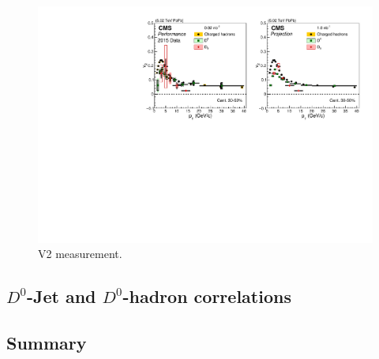 \begin{figure}[!ht]
\begin{center}
\includegraphics[width=.90\textwidth]{figures/cV2_lumiMB_1.pdf}
\caption{V2 measurement.}
\label{fig:v2_projection}
\end{center}
\end{figure}



\subsection{$D^0$-Jet and $D^0$-hadron correlations}


\subsection{Summary}

